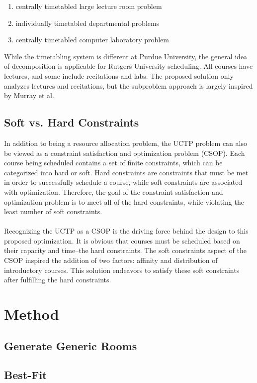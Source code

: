\documentclass[12pt]{article}
\begin{document}
\begin{enumerate}
	\item centrally timetabled large lecture room problem
	\item individually timetabled departmental problems
	\item centrally timetabled computer laboratory problem
\end{enumerate}

While the timetabling system is different at Purdue University, the general
idea of decomposition is applicable for Rutgers University scheduling. All
courses have lectures, and some include recitations and labs. The proposed
solution only analyzes lectures and recitations, but the subproblem approach is
largely inspired by Murray et al.

\subsection{Soft vs. Hard Constraints}
In addition to being a resource allocation problem, the UCTP problem can also
be viewed as a constraint satisfaction and optimization problem (CSOP). Each
course being scheduled contains a set of finite constraints, which can be
categorized into hard or soft. Hard constraints are constraints that must be
met in order to successfully schedule a course, while soft constraints are
associated with optimization. Therefore, the goal of the constraint
satisfaction and optimization problem is to meet all of the hard constraints,
while violating the least number of soft constraints.
\\\\
Recognizing the UCTP as a CSOP is the driving force behind the design to this
proposed optimization. It is obvious that courses must be scheduled based on
their capacity and time--the hard constraints. The soft constraints aspect of
the CSOP inspired the addition of two factors: affinity and distribution of
introductory courses. This solution endeavors to satisfy these soft constraints
after fulfilling the hard constraints.

\section{Method}
	\subsection{Generate Generic Rooms}
	
	\subsection{Best-Fit}
\end{document}

